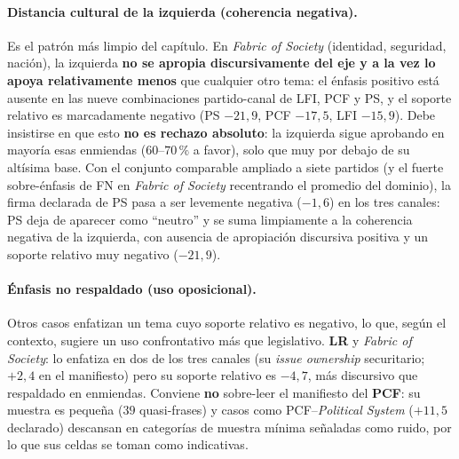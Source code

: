 \paragraph{Distancia cultural de la izquierda (coherencia negativa).}
Es el patrón más limpio del capítulo. En \emph{Fabric of Society} (identidad,
seguridad, nación), la izquierda \textbf{no se apropia discursivamente del eje y a
la vez lo apoya relativamente menos} que cualquier otro tema: el énfasis positivo
está ausente en las nueve combinaciones partido-canal de LFI, PCF y PS, y el
soporte relativo es marcadamente negativo (PS $-21{,}9$, PCF $-17{,}5$, LFI
$-15{,}9$). Debe insistirse en que esto \textbf{no es rechazo absoluto}: la
izquierda sigue aprobando en mayoría esas enmiendas ($60$--$70\,\%$ a favor), solo
que muy por debajo de su altísima base. Con el conjunto comparable ampliado a
siete partidos (y el fuerte sobre-énfasis de FN en \emph{Fabric of Society}
recentrando el promedio del dominio), la firma declarada de PS pasa a ser
levemente negativa ($-1{,}6$) en los tres canales: PS deja de aparecer como
``neutro'' y se suma limpiamente a la coherencia negativa de la izquierda, con
ausencia de apropiación discursiva positiva y un soporte relativo muy negativo
($-21{,}9$).

\paragraph{Énfasis no respaldado (uso oposicional).}
Otros casos enfatizan un tema cuyo soporte relativo es negativo, lo que, según el
contexto, sugiere un uso confrontativo más que legislativo. \textbf{LR} y
\emph{Fabric of Society}: lo enfatiza en dos de los tres canales (su \emph{issue
ownership} securitario; $+2{,}4$ en el manifiesto) pero su soporte relativo es
$-4{,}7$, más discursivo que respaldado en enmiendas. Conviene \textbf{no}
sobre-leer el manifiesto del \textbf{PCF}: su muestra es pequeña ($39$ quasi-frases)
y casos como PCF--\emph{Political System} ($+11{,}5$ declarado) descansan en
categorías de muestra mínima señaladas como ruido, por lo que sus celdas se toman
como indicativas.


